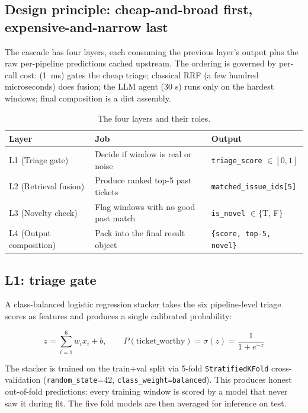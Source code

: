 \subsection{Design principle: cheap-and-broad first, expensive-and-narrow last}

The cascade has four layers, each consuming the previous layer's output plus the raw per-pipeline predictions cached upstream. The ordering is governed by per-call cost: \hgb{} (1~ms) gates the cheap triage; classical RRF (a few hundred microseconds) does fusion; the LLM agent (30 s) runs only on the hardest windows; final composition is a dict assembly.

\begin{table}[h]
\centering
\caption{The four layers and their roles.}
\label{tab:layers}
\small
\begin{tabular}{lll}
\toprule
Layer & Job & Output \\
\midrule
L1 (Triage gate) & Decide if window is real or noise & \texttt{triage\_score} $\in [0,1]$ \\
L2 (Retrieval fusion) & Produce ranked top-5 past tickets & \texttt{matched\_issue\_ids[5]} \\
L3 (Novelty check) & Flag windows with no good past match & \texttt{is\_novel} $\in \{$T, F$\}$ \\
L4 (Output composition) & Pack into the final result object & \texttt{\{score, top-5, novel\}} \\
\bottomrule
\end{tabular}
\end{table}

\subsection{L1: triage gate}

A class-balanced logistic regression stacker takes the six pipeline-level triage scores as features and produces a single calibrated probability:

\[
z = \sum_{i=1}^{6} w_i x_i + b, \qquad
P(\text{ticket\_worthy}) = \sigma(z) = \frac{1}{1 + e^{-z}}
\]

The stacker is trained on the train+val split via 5-fold \texttt{StratifiedKFold} cross-validation (\texttt{random\_state}=42, \texttt{class\_weight=balanced}). This produces honest out-of-fold predictions: every training window is scored by a model that never saw it during fit. The five fold models are then averaged for inference on test.

